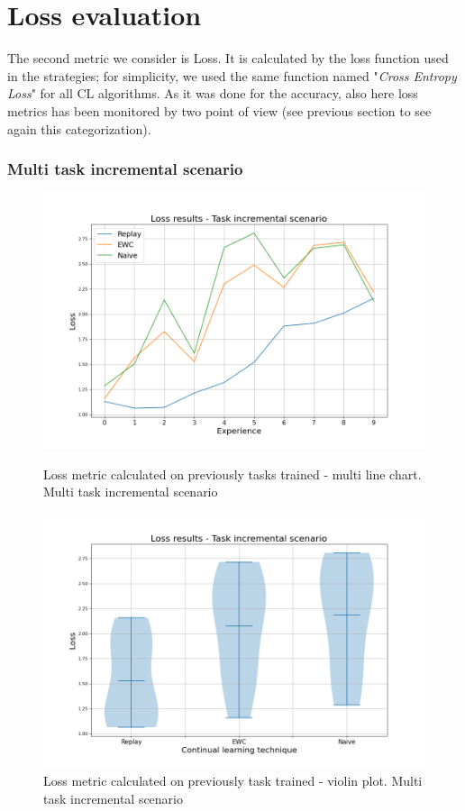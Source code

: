 \documentclass[english, LaM, oneside]{sapthesis}%
\begin{document}
\section{Loss evaluation}
The second metric we consider is Loss. It is calculated by the loss function used in the strategies; for simplicity, we used the same function named "\textit{Cross Entropy Loss}" for all CL algorithms. As it was done for the accuracy, also here loss metrics has been monitored by two point of view (see previous section to see again this categorization).
\subsubsection{Multi task incremental scenario}
\begin{figure}[h]
   \begin{minipage}{0.48\textwidth}
     \centering
     \includegraphics[width=1.1\linewidth]{overview_loss_before_nc.png}
     \caption{Loss metric calculated on previously tasks trained - multi line chart. Multi task incremental scenario}\label{Fig:95}
   \end{minipage}\hfill
   \begin{minipage}{0.48\textwidth}
     \centering
     \includegraphics[width=1.1\linewidth]{overview2_loss_before_nc.png}
     \caption{Loss metric calculated on previously task trained - violin plot. Multi task incremental scenario}\label{Fig:96}
   \end{minipage}
\end{figure}
\end{document}
